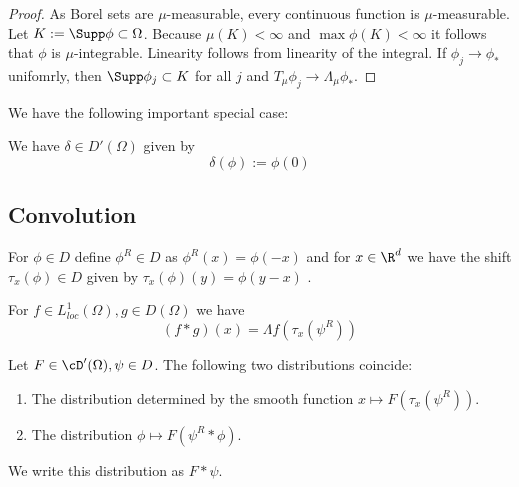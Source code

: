 \begin{proof}
	As Borel sets are $\mu$-measurable, every continuous function is $\mu$-measurable. Let $K := \Supp \phi \subset \Omega $. Because $\mu(K) < \infty$ and $\max \phi(K) < \infty$ it follows that $\phi$ is $\mu$-integrable. Linearity follows from linearity of the integral. If $\phi_j \to \phi_*$ unifomrly, then $\Supp \phi_j  \subset K$ for all $j$ and $T_\mu \phi_j \to \Lambda_\mu \phi_*$.
\end{proof}
We have the following important special case:
\begin{example}
	We have $\delta \in D'(\Omega)$ given by
	\[
	\delta(\phi) := \phi(0)
	\]
\end{example}

\subsection{Convolution}
\begin{notation}
	For $\phi \in D$ define $\phi^R \in D$ as $\phi^R(x) = \phi(-x)$ and for $x \in \R^d$ we have the shift $\tau_x(\phi) \in D$ given by $\tau_x(\phi)(y) = \phi(y - x)$ .
\end{notation}
\begin{example}{\label{ex:conv}}
	For $f \in L^1_{loc}(\Omega), g \in D(\Omega)$ we have
	\[
	(f * g)(x) = \Lambda f (\tau_x (\psi^R))
	\]
\end{example}
\begin{proposition}

	Let $F \in \cD'(\Omega) , \psi \in D$. The following two distributions coincide:
	\begin{enumerate}
		\item The distribution determined by the smooth function $x \mapsto F(\tau_x (\psi^R))$.
		\item The distribution $\phi \mapsto F(\psi^R * \phi)$.
	\end{enumerate}
	We write this distribution as $F * \psi$.
\end{proposition}

